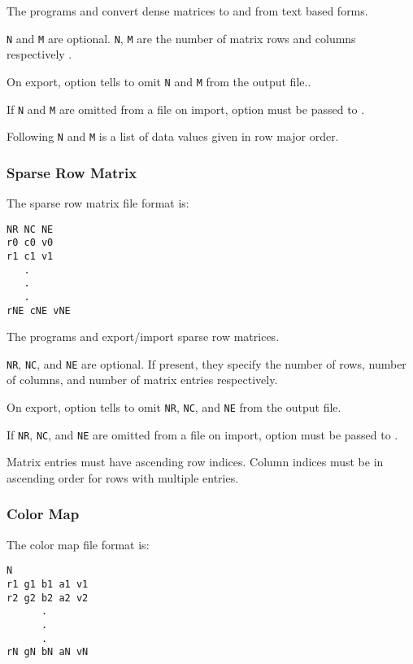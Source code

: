 The programs  and  
convert dense matrices to and from text based forms.

\verb|N| and \verb|M| are optional.  \verb|N|, \verb|M| are the number
of matrix rows and columns respectively .  

On export, option  tells
 to omit \verb|N| and \verb|M| from the
output file..

If \verb|N| and \verb|M| are omitted from a file on import, option
 must be passed to
.

Following \verb|N| and \verb|M| is a list of data values given in row
major order.


\subsubsection{Sparse Row Matrix}

The sparse row matrix file format is:

\begin{verbatim}
NR NC NE
r0 c0 v0
r1 c1 v1
   .
   .
   .
rNE cNE vNE
\end{verbatim}

The programs  and
 export/import sparse row matrices.

\verb|NR|, \verb|NC|, and \verb|NE| are optional.  If present, they
specify the number of rows, number of columns, and number of matrix
entries respectively.

On export, option  tells
 to omit \verb|NR|, \verb|NC|, and
\verb|NE| from the output file.

If \verb|NR|, \verb|NC|, and \verb|NE| are omitted from a file on
import, option  must be passed to .

Matrix entries must have ascending row indices. Column indices must be
in ascending order for rows with multiple entries.

\subsubsection{Color Map}
\label{sec:colormap_fmt}

The color map file format is:

\begin{verbatim}
N
r1 g1 b1 a1 v1
r2 g2 b2 a2 v2
      .
      .
      .
rN gN bN aN vN
\end{verbatim}

